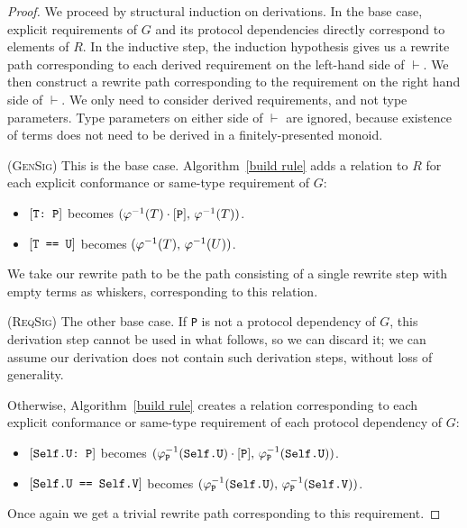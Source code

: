 \documentclass[../generics]{subfiles}
\begin{document}
\begin{proof}
We proceed by structural induction on derivations. In the base case, explicit requirements of $G$ and its protocol dependencies directly correspond to elements of $R$. In the inductive step, the induction hypothesis gives us a rewrite path corresponding to each derived requirement on the left-hand side of $\vdash$. We then construct a rewrite path corresponding to the requirement on the right hand side of $\vdash$. We only need to consider derived requirements, and not type parameters. Type parameters on either side of $\vdash$ are ignored, because existence of terms does not need to be derived in a finitely-presented monoid.

(\textsc{GenSig}) This is the base case. Algorithm~\ref{build rule} adds a relation to $R$ for each explicit conformance or same-type requirement of $G$:
\begin{itemize}
\item $[\texttt{T:~P}]$ becomes $(\varphi^{-1}(T)\cdot[\texttt{P}],\,\varphi^{-1}(T))$.
\item $[\texttt{T == U}]$ becomes $(\varphi^{-1}(T),\,\varphi^{-1}(U))$.
\end{itemize}
We take our rewrite path to be the path consisting of a single rewrite step with empty terms as whiskers, corresponding to this relation.

(\textsc{ReqSig}) The other base case. If \texttt{P} is not a protocol dependency of $G$, this derivation step cannot be used in what follows, so we can discard it; we can assume our derivation does not contain such derivation steps, without loss of generality.

Otherwise, Algorithm~\ref{build rule} creates a relation corresponding to each explicit conformance or same-type requirement of each protocol dependency of $G$:
\begin{itemize}
\item $[\texttt{Self.U:~P}]$ becomes $(\varphi^{-1}_\texttt{P}(\texttt{Self.U})\cdot[\texttt{P}],\,\varphi^{-1}_\texttt{P}(\texttt{Self.U}))$.
\item $[\texttt{Self.U == Self.V}]$ becomes $(\varphi^{-1}_\texttt{P}(\texttt{Self.U}),\,\varphi^{-1}_\texttt{P}(\texttt{Self.V}))$.
\end{itemize}
Once again we get a trivial rewrite path corresponding to this requirement.


\end{proof}
\end{document}
